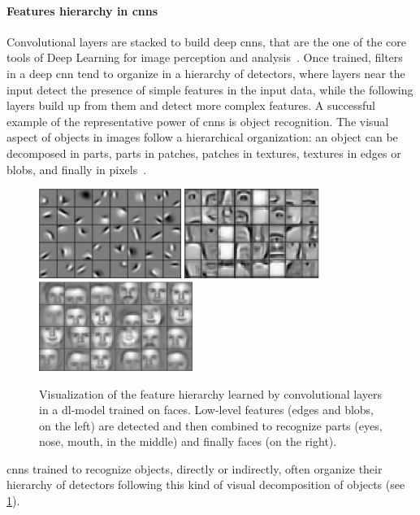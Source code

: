 \paragraph{Features hierarchy in \glspl{cnn}}
Convolutional layers are stacked to build deep \glspl{cnn}, that are the one of the core tools of Deep Learning for image perception and analysis~\cite{krizhevsky2012imagenet,sermanet2013overfeat,simonyan2014very,he2015delving,he2016deep,xie2017aggregated}.
Once trained, filters in a deep \gls{cnn} tend to organize in a hierarchy of detectors, where layers near the input detect the presence of simple features in the input data, while the following layers build up from them and detect more complex features.
A successful example of the representative power of \glspl{cnn} is object recognition.
The visual aspect of objects in images follow a hierarchical organization: an object can be decomposed in parts, parts in patches, patches in textures, textures in edges or blobs, and finally in pixels~\cite{}.
\begin{figure}
    \centering
    \includegraphics[height=2.9cm]{img/feat-hier-1.png}%
    \hfill%
    \includegraphics[height=2.9cm]{img/feat-hier-2.png}%
    \hfill%
    \includegraphics[height=2.9cm]{img/feat-hier-3.png}%
    \newline
    \caption{
    Visualization of the feature hierarchy learned by convolutional layers in a \gls{dl}-model trained on faces.
    Low-level features (edges and blobs, on the left) are detected and then combined to recognize parts (eyes, nose, mouth, in the middle) and finally faces (on the right).
    }
    \label{fig:back:filter-hier}
\end{figure}
\Glspl{cnn} trained to recognize objects, directly or indirectly, often organize their hierarchy of detectors following this kind of visual decomposition of objects (see \ref{fig:back:filter-hier}).


